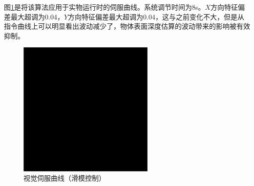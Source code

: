 \documentclass[fontset=fandol,type=bachelor,campus=harbin,bsmainpagenumberline=true]{hithesisbook}
\begin{document}
图\ref{视觉伺服曲线（滑模控制）}是将该算法应用于实物运行时的伺服曲线。系统调节时间为8s。$X$方向特征偏差最大超调为0.04，$Y$方向特征偏差最大超调为0.04，这与之前变化不大，但是从指令曲线上可以明显看出波动减少了，物体表面深度估算的波动带来的影响被有效抑制。
\begin{figure}[h]
	\centering
	\includegraphics[width=0.6\textwidth]{chapter5/替身}
	\caption{视觉伺服曲线（滑模控制）}
	\label{视觉伺服曲线（滑模控制）}
\end{figure}
%
%
\end{document}
